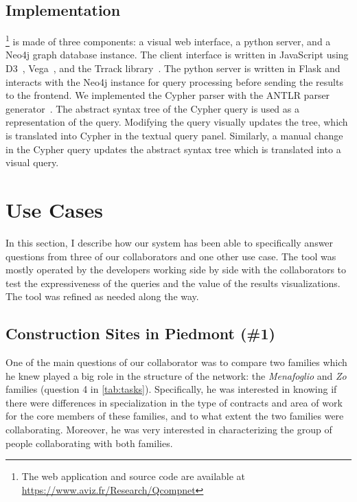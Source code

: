 \subsection{Implementation}

\name\footnote{The web application and source code are available at \url{https://www.aviz.fr/Research/Qcompnet}} is made of three components: a visual web interface, a python server, and a Neo4j\cite{neo4j} graph database instance.
The client interface is written in JavaScript using D3~\cite{d3}, Vega~\cite{satyanarayan2016vega}, and the Trrack library~\cite{cutlerTrrackLibraryProvenanceTracking2020}.
The python server is written in Flask and interacts with the Neo4j instance for query processing before sending the results to the frontend.
We implemented the Cypher parser with the ANTLR parser generator~\cite{parr1995antlr}.
The abstract syntax tree of the Cypher query is used as a representation of the query.
Modifying the query visually updates the tree, which is translated into Cypher in the textual query panel.
Similarly, a manual change in the Cypher query updates the abstract syntax tree which is translated into a visual query.



\section{Use Cases}\label{sec:combinet-usecases}

In this section, I describe how our system has been able to specifically answer questions from three of our collaborators and one other use case.
The tool was mostly operated by the developers working side by side with the collaborators to test the expressiveness of the queries and the value of the results visualizations.
The tool was refined as needed along the way.


\subsection{Construction Sites in Piedmont (\#1)}

One of the main questions of our collaborator was to compare two families which he knew played a big role in the structure of the network: the \textit{Menafoglio} and \textit{Zo} families (question 4 in \autoref{tab:tasks}).
Specifically, he was interested in knowing if there were differences in specialization in the type of contracts and area of work for the core members of these families, and to what extent the two families were collaborating.
Moreover, he was very interested in characterizing the group of people collaborating with both families.

